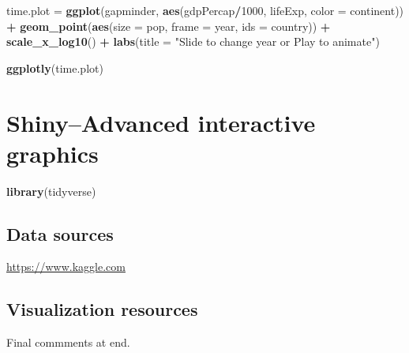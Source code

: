 \documentclass[]{krantz}
\makeatletter
\newenvironment{Shaded}{\begin{snugshade}}{\end{snugshade}}
\newcommand{\DataTypeTok}[1]{\textcolor[rgb]{0.13,0.29,0.53}{#1}}
\newcommand{\DecValTok}[1]{\textcolor[rgb]{0.00,0.00,0.81}{#1}}
\newcommand{\KeywordTok}[1]{\textcolor[rgb]{0.13,0.29,0.53}{\textbf{#1}}}
\newcommand{\NormalTok}[1]{#1}
\newcommand{\OperatorTok}[1]{\textcolor[rgb]{0.81,0.36,0.00}{\textbf{#1}}}
\newcommand{\StringTok}[1]{\textcolor[rgb]{0.31,0.60,0.02}{#1}}
\newenvironment{kframe}{%
\medskip{}
\setlength{\fboxsep}{.8em}
 \def\at@end@of@kframe{}%
 \ifinner\ifhmode%
  \def\at@end@of@kframe{\end{minipage}}%
  \begin{minipage}{\columnwidth}%
 \fi\fi%
 \def\FrameCommand##1{\hskip\@totalleftmargin \hskip-\fboxsep
 \colorbox{shadecolor}{##1}\hskip-\fboxsep
     \hskip-\linewidth \hskip-\@totalleftmargin \hskip\columnwidth}%
 \MakeFramed {\advance\hsize-\width
   \@totalleftmargin\z@ \linewidth\hsize
   \@setminipage}}%
 {\par\unskip\endMakeFramed%
 \at@end@of@kframe}
\renewenvironment{Shaded}{\begin{kframe}}{\end{kframe}}
\makeatother
\begin{document}
\begin{Shaded}
\begin{Highlighting}[]
\NormalTok{time.plot =}\StringTok{ }
\KeywordTok{ggplot}\NormalTok{(gapminder, }\KeywordTok{aes}\NormalTok{(gdpPercap}\OperatorTok{/}\DecValTok{1000}\NormalTok{, lifeExp, }\DataTypeTok{color =}\NormalTok{ continent)) }\OperatorTok{+}
\StringTok{  }\KeywordTok{geom_point}\NormalTok{(}\KeywordTok{aes}\NormalTok{(}\DataTypeTok{size =}\NormalTok{ pop, }\DataTypeTok{frame =}\NormalTok{ year, }\DataTypeTok{ids =}\NormalTok{ country)) }\OperatorTok{+}
\StringTok{  }\KeywordTok{scale_x_log10}\NormalTok{() }\OperatorTok{+}
\StringTok{  }\KeywordTok{labs}\NormalTok{(}\DataTypeTok{title =} \StringTok{"Slide to change year or Play to animate"}\NormalTok{)}

\KeywordTok{ggplotly}\NormalTok{(time.plot)}
\end{Highlighting}
\end{Shaded}

\hypertarget{htmlwidget-9e5e7c197191de9b64d6}{}

\cleardoublepage

\hypertarget{shinyadvanced-interactive-graphics}{%
\chapter{Shiny--Advanced interactive graphics}\label{shinyadvanced-interactive-graphics}}

\begin{Shaded}
\begin{Highlighting}[]
\KeywordTok{library}\NormalTok{(tidyverse)}
\end{Highlighting}
\end{Shaded}

\cleardoublepage

\hypertarget{appendix-appendix}{%
\appendix {}}


\hypertarget{data-sources-1}{%
\section{Data sources}\label{data-sources-1}}

\url{https://www.kaggle.com}

\hypertarget{visualization-resources}{%
\section{Visualization resources}\label{visualization-resources}}

Final commments at end.



\backmatter
\printindex
\end{document}
